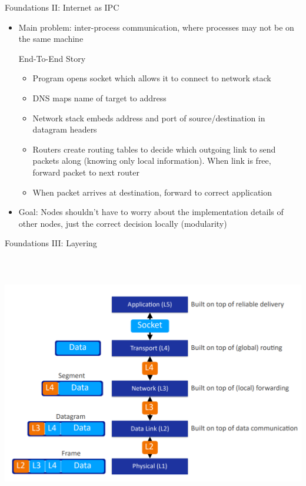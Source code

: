 \documentclass{beamer}
\begin{document}
\begin{frame}[t]{Foundations II: Internet as IPC}
    \begin{itemize}
        \item Main problem: \alert{inter-process communication}, where processes may not be on the same machine
        \begin{exampleblock}{End-To-End Story}
            \begin{itemize}
                \item \pause Program opens \alert{socket} which allows it to connect to \alert{network stack}
                \item \pause \alert{DNS} maps name of target to \alert{address}
                \item \pause Network stack embeds address and \alert{port} of source/destination in datagram headers
                \item \pause \alert{Routers} create \alert{routing tables} to decide which \alert{outgoing link} to send packets along (knowing only local information). When link is free, forward packet to next router
                \item \pause When packet arrives at destination, forward to correct application
            \end{itemize}
        \end{exampleblock}
        \item Goal: Nodes shouldn't have to worry about the implementation details of other nodes, just the correct decision locally (modularity)
    \end{itemize}
\end{frame}

\begin{frame}[t]{Foundations III: Layering}
    \includegraphics[height=12cm]{layer diagram.png}
\end{frame}
\end{document}
